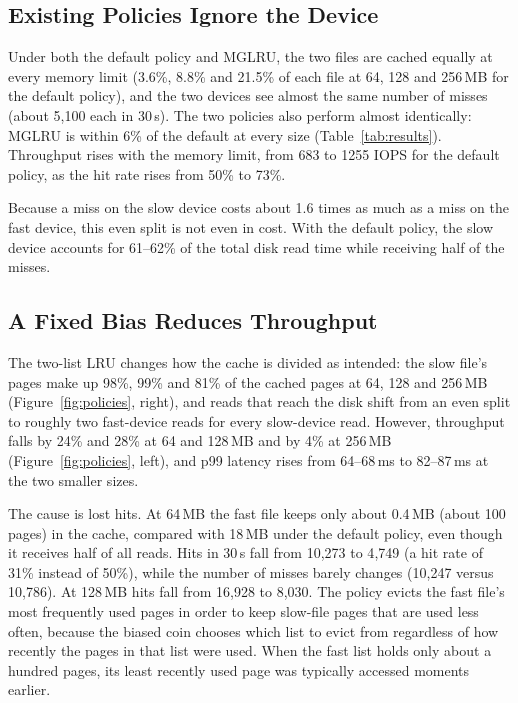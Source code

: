 \documentclass[11pt,sigconf,nonacm]{acmart}
\begin{document}
\subsection{Existing Policies Ignore the Device}

Under both the default policy and MGLRU, the two files are cached equally at every memory limit (3.6\%, 8.8\% and 21.5\% of each file at 64, 128 and 256\,MB for the default policy), and the two devices see almost the same number of misses (about 5{,}100 each in 30\,s). The two policies also perform almost identically: MGLRU is within 6\% of the default at every size (Table~\ref{tab:results}). Throughput rises with the memory limit, from 683 to 1255 IOPS for the default policy, as the hit rate rises from 50\% to 73\%.

Because a miss on the slow device costs about 1.6 times as much as a miss on the fast device, this even split is not even in cost. With the default policy, the slow device accounts for 61--62\% of the total disk read time while receiving half of the misses.

\subsection{A Fixed Bias Reduces Throughput}

The two-list LRU changes how the cache is divided as intended: the slow file's pages make up 98\%, 99\% and 81\% of the cached pages at 64, 128 and 256\,MB (Figure~\ref{fig:policies}, right), and reads that reach the disk shift from an even split to roughly two fast-device reads for every slow-device read. However, throughput falls by 24\% and 28\% at 64 and 128\,MB and by 4\% at 256\,MB (Figure~\ref{fig:policies}, left), and p99 latency rises from 64--68\,ms to 82--87\,ms at the two smaller sizes.

The cause is lost hits. At 64\,MB the fast file keeps only about 0.4\,MB (about 100 pages) in the cache, compared with 18\,MB under the default policy, even though it receives half of all reads. Hits in 30\,s fall from 10{,}273 to 4{,}749 (a hit rate of 31\% instead of 50\%), while the number of misses barely changes (10{,}247 versus 10{,}786). At 128\,MB hits fall from 16{,}928 to 8{,}030. The policy evicts the fast file's most frequently used pages in order to keep slow-file pages that are used less often, because the biased coin chooses which list to evict from regardless of how recently the pages in that list were used. When the fast list holds only about a hundred pages, its least recently used page was typically accessed moments earlier.
\end{document}
